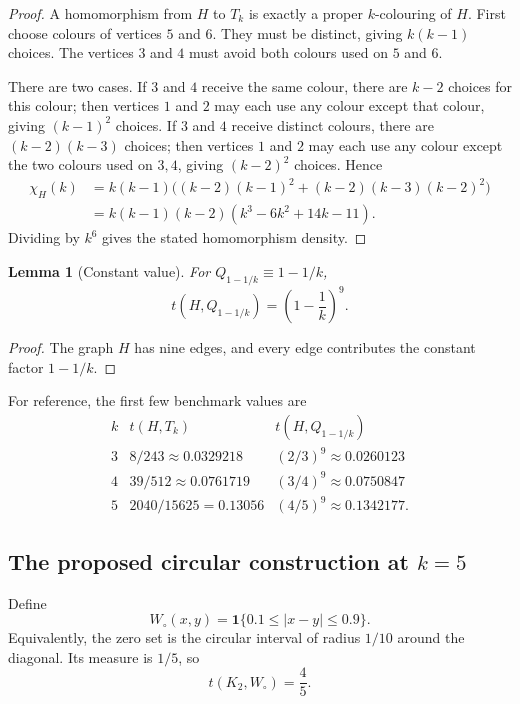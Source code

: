 \documentclass[11pt]{amsart}
\newtheorem{lemma}[theorem]{Lemma}
\theoremstyle{definition}
\newcommand{\1}{\mathbf 1}
\begin{document}
\begin{proof}
A homomorphism from $H$ to $T_k$ is exactly a proper $k$-colouring of $H$.  First
choose colours of vertices $5$ and $6$.  They must be distinct, giving $k(k-1)$
choices.  The vertices $3$ and $4$ must avoid both colours used on $5$ and $6$.

There are two cases.  If $3$ and $4$ receive the same colour, there are $k-2$
choices for this colour; then vertices $1$ and $2$ may each use any colour
except that colour, giving $(k-1)^2$ choices.  If $3$ and $4$ receive distinct
colours, there are $(k-2)(k-3)$ choices; then vertices $1$ and $2$ may each use
any colour except the two colours used on $3,4$, giving $(k-2)^2$ choices.
Hence
\[
\begin{split}
\chi_H(k)&=k(k-1)\bigl((k-2)(k-1)^2+(k-2)(k-3)(k-2)^2\bigr)\\
&=k(k-1)(k-2)(k^3-6k^2+14k-11).
\end{split}
\]
Dividing by $k^6$ gives the stated homomorphism density.
\end{proof}

\begin{lemma}[Constant value]
For $Q_{1-1/k}\equiv 1-1/k$,
\[
   t(H,Q_{1-1/k})=\left(1-\frac1k\right)^9.
\]
\end{lemma}

\begin{proof}
The graph $H$ has nine edges, and every edge contributes the constant factor
$1-1/k$.
\end{proof}

For reference, the first few benchmark values are
\[
\begin{array}{c|c|c}
 k & t(H,T_k) & t(H,Q_{1-1/k})\\ \hline
 3 & 8/243\approx 0.0329218 & (2/3)^9\approx 0.0260123\\
 4 & 39/512\approx 0.0761719 & (3/4)^9\approx 0.0750847\\
 5 & 2040/15625=0.13056 & (4/5)^9\approx 0.1342177.
\end{array}
\]

\subsection{The proposed circular construction at $k=5$}

Define
\[
   W_\circ(x,y)=\1\{0.1\le |x-y|\le 0.9\}.
\]
Equivalently, the zero set is the circular interval of radius $1/10$ around the
diagonal.  Its measure is $1/5$, so
\[
   t(K_2,W_\circ)=\frac45.
\]
\end{document}
